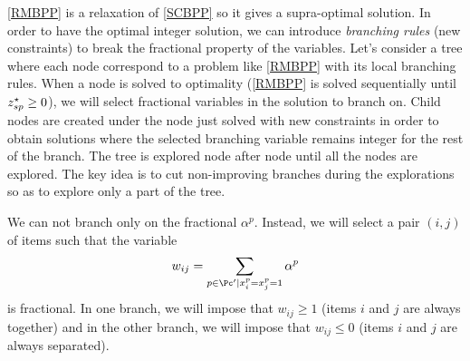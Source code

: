 \eqref{RMBPP} is a relaxation of \eqref{SCBPP} so it gives a supra-optimal solution. In order to have the optimal integer solution, we can introduce \textit{branching rules} (new constraints) to break the fractional property of the variables. Let's consider a tree where each node correspond to a problem like \eqref{RMBPP} with its local branching rules. When a node is solved to optimality (\ie \eqref{RMBPP} is solved sequentially until ${z}^{\star}_{sp} \geq 0$), we will select fractional variables in the solution to branch on. Child nodes are created under the node just solved with new constraints in order to
obtain solutions where the selected branching variable remains integer for the rest of the branch. The tree is explored node after node until all the nodes are explored. The key idea is  to cut non-improving branches during the explorations so as to explore only a part of the tree.

We can not branch only on the fractional $\alpha^p$. Instead, we will select a pair $(i,j)$ of items such that the variable
\begin{equation*}
	w_{ij} = \sum_{p \in \Pc' | x_i^p=x_j^p=1} \alpha^p
\end{equation*}
is fractional. In one branch, we will impose that $w_{ij} \geq 1$ (items $i$ and $j$ are always together) and in the other branch, we will impose that $w_{ij} \leq 0$ (items $i$ and $j$ are always separated).

